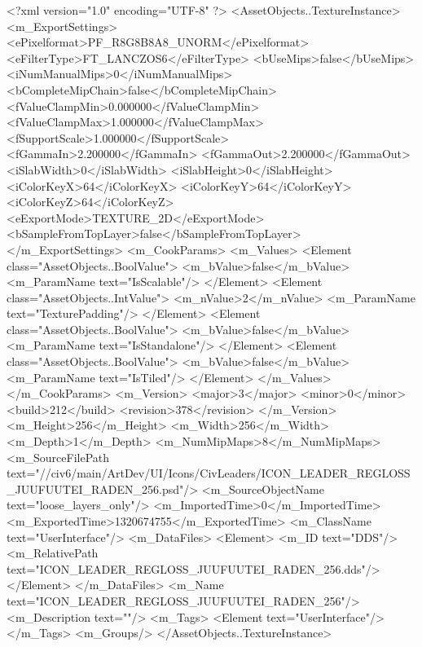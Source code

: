 <?xml version="1.0" encoding="UTF-8" ?>
<AssetObjects..TextureInstance>
	<m_ExportSettings>
		<ePixelformat>PF_R8G8B8A8_UNORM</ePixelformat>
		<eFilterType>FT_LANCZOS6</eFilterType>
		<bUseMips>false</bUseMips>
		<iNumManualMips>0</iNumManualMips>
		<bCompleteMipChain>false</bCompleteMipChain>
		<fValueClampMin>0.000000</fValueClampMin>
		<fValueClampMax>1.000000</fValueClampMax>
		<fSupportScale>1.000000</fSupportScale>
		<fGammaIn>2.200000</fGammaIn>
		<fGammaOut>2.200000</fGammaOut>
		<iSlabWidth>0</iSlabWidth>
		<iSlabHeight>0</iSlabHeight>
		<iColorKeyX>64</iColorKeyX>
		<iColorKeyY>64</iColorKeyY>
		<iColorKeyZ>64</iColorKeyZ>
		<eExportMode>TEXTURE_2D</eExportMode>
		<bSampleFromTopLayer>false</bSampleFromTopLayer>
	</m_ExportSettings>
	<m_CookParams>
		<m_Values>
			<Element class="AssetObjects..BoolValue">
				<m_bValue>false</m_bValue>
				<m_ParamName text="IsScalable"/>
			</Element>
			<Element class="AssetObjects..IntValue">
				<m_nValue>2</m_nValue>
				<m_ParamName text="TexturePadding"/>
			</Element>
			<Element class="AssetObjects..BoolValue">
				<m_bValue>false</m_bValue>
				<m_ParamName text="IsStandalone"/>
			</Element>
			<Element class="AssetObjects..BoolValue">
				<m_bValue>false</m_bValue>
				<m_ParamName text="IsTiled"/>
			</Element>
		</m_Values>
	</m_CookParams>
	<m_Version>
		<major>3</major>
		<minor>0</minor>
		<build>212</build>
		<revision>378</revision>
	</m_Version>
	<m_Height>256</m_Height>
	<m_Width>256</m_Width>
	<m_Depth>1</m_Depth>
	<m_NumMipMaps>8</m_NumMipMaps>
	<m_SourceFilePath text="//civ6/main/ArtDev/UI/Icons/CivLeaders/ICON_LEADER_REGLOSS_JUUFUUTEI_RADEN_256.psd"/>
	<m_SourceObjectName text="loose_layers_only"/>
	<m_ImportedTime>0</m_ImportedTime>
	<m_ExportedTime>1320674755</m_ExportedTime>
	<m_ClassName text="UserInterface"/>
	<m_DataFiles>
		<Element>
			<m_ID text="DDS"/>
			<m_RelativePath text="ICON_LEADER_REGLOSS_JUUFUUTEI_RADEN_256.dds"/>
		</Element>
	</m_DataFiles>
	<m_Name text="ICON_LEADER_REGLOSS_JUUFUUTEI_RADEN_256"/>
	<m_Description text=""/>
	<m_Tags>
		<Element text="UserInterface"/>
	</m_Tags>
	<m_Groups/>
</AssetObjects..TextureInstance>

